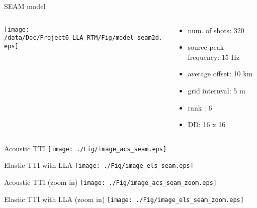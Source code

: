 \documentclass[aspectratio=43]{beamer}
\begin{document}
\begin{frame}{SEAM model}
\begin{columns}
  \begin{column}{0.6\textwidth}
  \texttt{[image: /data/Doc/Project6\_LLA\_RTM/Fig/model\_seam2d.eps]}
  \end{column}
  \begin{column}{0.4\textwidth}
\begin{itemize}
\item{num. of shots: 320}
\item{source peak frequency: 15 Hz}
\item{average offset: 10 km}
\item{grid internval: 5 m}
\item{rank : 6}
\item{DD: 16 x 16}
\end{itemize}
  \end{column}
\end{columns}
\end{frame}
\begin{frame}{Acoustic TTI}
\center
  \texttt{[image: ./Fig/image\_acs\_seam.eps]}
\end{frame}
\begin{frame}{Elastic TTI with LLA}
\center
  \texttt{[image: ./Fig/image\_els\_seam.eps]}
\end{frame}
\begin{frame}{Acoustic TTI (zoom in)}
\center
  \texttt{[image: ./Fig/image\_acs\_seam\_zoom.eps]}
\end{frame}
\begin{frame}{Elastic TTI with LLA (zoom in)}
\center
  \texttt{[image: ./Fig/image\_els\_seam\_zoom.eps]}
\end{frame}
\end{document}
